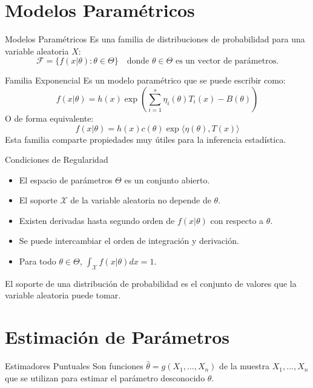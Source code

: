 \documentclass[a4paper,11pt]{article}
\begin{document}
\newpage
\section{Modelos Paramétricos}

\begin{definicion}{Modelos Paramétricos}{}
    Es una familia de distribuciones de probabilidad para una variable aleatoria $X$:
    \[ \mathcal{F} = \{ f(x|\theta) : \theta \in \Theta \} \quad \text{donde } \theta \in \Theta \text{ es un vector de parámetros.} \]
\end{definicion}

\begin{definicion}{Familia Exponencial}{}
    Es un modelo paramétrico que se puede escribir como:
    \[ f(x|\theta) = h(x) \exp{\left( \sum_{i=1}^s \eta_i(\theta) T_i(x) - B(\theta) \right)}\]
    O de forma equivalente:
    \[ f(x|\theta) = h(x) c(\theta) \exp{\langle \eta(\theta), T(x) \rangle}\]
    Esta familia comparte propiedades muy útiles para la inferencia estadística.
\end{definicion}

\begin{definicion}{Condiciones de Regularidad}{}
    \begin{itemize}
        \item El espacio de parámetros $\Theta$ es un conjunto abierto.
        \item El soporte $\mathcal{X}$ de la variable aleatoria no depende de $\theta$.
        \item Existen derivadas hasta segundo orden de $f(x|\theta)$ con respecto a $\theta$.
        \item Se puede intercambiar el orden de integración y derivación.
        \item Para todo $\theta \in \Theta$, $\int_{\mathcal{X}} f(x|\theta) dx = 1$.
    \end{itemize}
    \begin{nota}[Recordatorio]
        El soporte de una distribución de probabilidad es el conjunto de valores que la variable aleatoria puede tomar.
    \end{nota}
\end{definicion}

\newpage
\section{Estimación de Parámetros}

\begin{definicion}{Estimadores Puntuales}{}
    Son funciones $\hat{\theta} = g(X_1, ..., X_n)$ de la muestra $X_1, ..., X_n$ que se utilizan para estimar el parámetro desconocido $\theta$.
\end{definicion}
\end{document}
